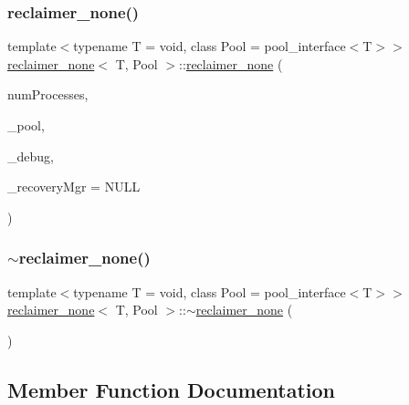 \subsubsection{\texorpdfstring{reclaimer\+\_\+none()}{reclaimer\_none()}}
{\footnotesize\ttfamily template$<$typename T  = void, class Pool  = pool\+\_\+interface$<$\+T$>$$>$ \\
\hyperlink{classreclaimer__none}{reclaimer\+\_\+none}$<$ T, Pool $>$\+::\hyperlink{classreclaimer__none}{reclaimer\+\_\+none} (\begin{DoxyParamCaption}\item[{const int}]{num\+Processes,  }\item[{Pool $\ast$}]{\+\_\+pool,  }\item[{\hyperlink{classdebugInfo}{debug\+Info} $\ast$const}]{\+\_\+debug,  }\item[{\hyperlink{classRecoveryMgr}{Recovery\+Mgr}$<$ void $\ast$$>$ $\ast$const}]{\+\_\+recovery\+Mgr = {\ttfamily NULL} }\end{DoxyParamCaption})\hspace{0.3cm}{\ttfamily [inline]}}

\mbox{\label{classreclaimer__none_a7015c1c9dd0a1151e59c06b8cada74a9}} 
\subsubsection{\texorpdfstring{$\sim$reclaimer\+\_\+none()}{~reclaimer\_none()}}
{\footnotesize\ttfamily template$<$typename T  = void, class Pool  = pool\+\_\+interface$<$\+T$>$$>$ \\
\hyperlink{classreclaimer__none}{reclaimer\+\_\+none}$<$ T, Pool $>$\+::$\sim$\hyperlink{classreclaimer__none}{reclaimer\+\_\+none} (\begin{DoxyParamCaption}{ }\end{DoxyParamCaption})\hspace{0.3cm}{\ttfamily [inline]}}



\subsection{Member Function Documentation}
\mbox{\label{classreclaimer__none_ae70908a43f8772e5294c5f5ceae0716c}} 
